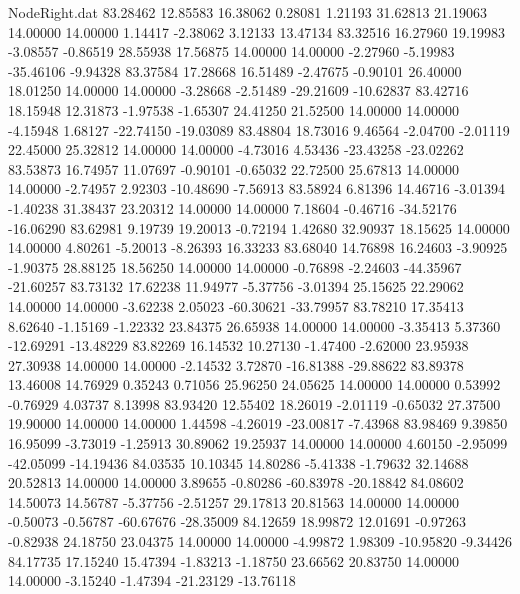 \begin{filecontents}{NodeRight.dat}
  83.28462   12.85583   16.38062     0.28081    1.21193   31.62813   21.19063   14.00000   14.00000    1.14417   -2.38062    3.12133   13.47134
  83.32516   16.27960   19.19983    -3.08557   -0.86519   28.55938   17.56875   14.00000   14.00000   -2.27960   -5.19983  -35.46106   -9.94328
  83.37584   17.28668   16.51489    -2.47675   -0.90101   26.40000   18.01250   14.00000   14.00000   -3.28668   -2.51489  -29.21609  -10.62837
  83.42716   18.15948   12.31873    -1.97538   -1.65307   24.41250   21.52500   14.00000   14.00000   -4.15948    1.68127  -22.74150  -19.03089
  83.48804   18.73016    9.46564    -2.04700   -2.01119   22.45000   25.32812   14.00000   14.00000   -4.73016    4.53436  -23.43258  -23.02262
  83.53873   16.74957   11.07697    -0.90101   -0.65032   22.72500   25.67813   14.00000   14.00000   -2.74957    2.92303  -10.48690   -7.56913
  83.58924    6.81396   14.46716    -3.01394   -1.40238   31.38437   23.20312   14.00000   14.00000    7.18604   -0.46716  -34.52176  -16.06290
  83.62981    9.19739   19.20013    -0.72194    1.42680   32.90937   18.15625   14.00000   14.00000    4.80261   -5.20013   -8.26393   16.33233
  83.68040   14.76898   16.24603    -3.90925   -1.90375   28.88125   18.56250   14.00000   14.00000   -0.76898   -2.24603  -44.35967  -21.60257
  83.73132   17.62238   11.94977    -5.37756   -3.01394   25.15625   22.29062   14.00000   14.00000   -3.62238    2.05023  -60.30621  -33.79957
  83.78210   17.35413    8.62640    -1.15169   -1.22332   23.84375   26.65938   14.00000   14.00000   -3.35413    5.37360  -12.69291  -13.48229
  83.82269   16.14532   10.27130    -1.47400   -2.62000   23.95938   27.30938   14.00000   14.00000   -2.14532    3.72870  -16.81388  -29.88622
  83.89378   13.46008   14.76929     0.35243    0.71056   25.96250   24.05625   14.00000   14.00000    0.53992   -0.76929    4.03737    8.13998
  83.93420   12.55402   18.26019    -2.01119   -0.65032   27.37500   19.90000   14.00000   14.00000    1.44598   -4.26019  -23.00817   -7.43968
  83.98469    9.39850   16.95099    -3.73019   -1.25913   30.89062   19.25937   14.00000   14.00000    4.60150   -2.95099  -42.05099  -14.19436
  84.03535   10.10345   14.80286    -5.41338   -1.79632   32.14688   20.52813   14.00000   14.00000    3.89655   -0.80286  -60.83978  -20.18842
  84.08602   14.50073   14.56787    -5.37756   -2.51257   29.17813   20.81563   14.00000   14.00000   -0.50073   -0.56787  -60.67676  -28.35009
  84.12659   18.99872   12.01691    -0.97263   -0.82938   24.18750   23.04375   14.00000   14.00000   -4.99872    1.98309  -10.95820   -9.34426
  84.17735   17.15240   15.47394    -1.83213   -1.18750   23.66562   20.83750   14.00000   14.00000   -3.15240   -1.47394  -21.23129  -13.76118

\end{filecontents}
